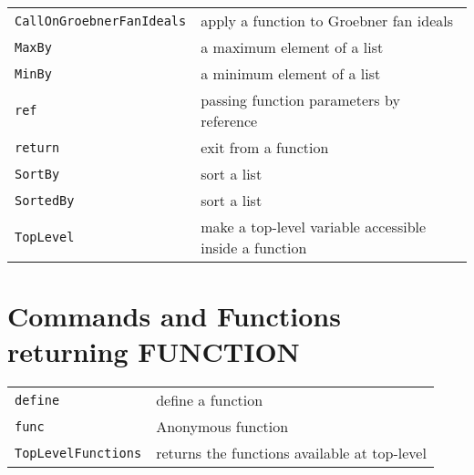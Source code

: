 \documentclass[a4paper]{mybook}
\begin{document}
\begin{center}
\begin{longtable}{ll}
   
{\verb~CallOnGroebnerFanIdeals~} &
      apply a function to Groebner fan ideals\\
   
{\verb~MaxBy~} &
      a maximum element of a list\\
   
{\verb~MinBy~} &
      a minimum element of a list\\
   
{\verb~ref~} &
      passing function parameters by reference\\
   
{\verb~return~} &
      exit from a function\\
   
{\verb~SortBy~} &
      sort a list\\
   
{\verb~SortedBy~} &
      sort a list\\
   
{\verb~TopLevel~} &
      make a top-level variable accessible inside a function\\
   
\end{longtable}
\end{center}

\noindent



\section{Commands and Functions returning FUNCTION}
\label{Commands and Functions returning FUNCTION}

        

\begin{center}
\begin{longtable}{ll}
   
{\verb~define~} &
      define a function\\
   
{\verb~func~} &
      Anonymous function\\
   
{\verb~TopLevelFunctions~} &
      returns the functions available at top-level\\
   
\end{longtable}
\end{center}
\end{document}
